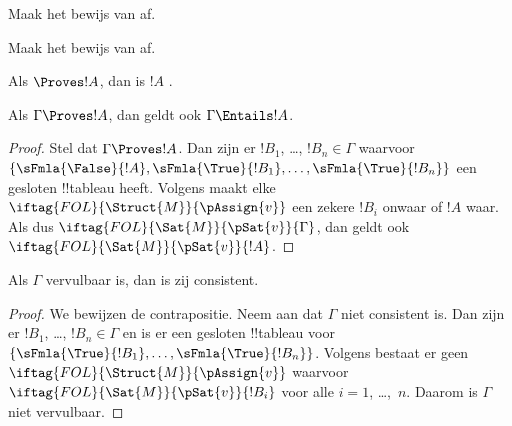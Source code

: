 \documentclass[../../../include/open-logic-section]{subfiles}
\begin{document}
\begin{prob}
Maak het bewijs van  af.
\end{prob}
\tagendprob

\begin{prob}
Maak het bewijs van  af.
\end{prob}
\tagendprob

\begin{cor}
Als $\Proves !A$, dan is $!A$ .
\end{cor}

\begin{cor}
Als $\Gamma \Proves !A$, dan geldt ook $\Gamma \Entails !A$.
\end{cor}

\begin{proof}
  Stel dat $\Gamma \Proves !A$. Dan zijn er $!B_1$, \dots,
  $!B_n \in \Gamma$ waarvoor
  $\{\sFmla{\False}{!A}, \sFmla{\True}{!B_1}, \dots,
  \sFmla{\True}{!B_n}\}$ een gesloten !!{tableau} heeft. Volgens
   maakt elke
  ~$\iftag{FOL}{\Struct{M}}{\pAssign{v}}$
  een zekere $!B_i$ onwaar of $!A$ waar. Als dus
  $\iftag{FOL}{\Sat{M}}{\pSat{v}}{\Gamma}$, dan geldt ook
  $\iftag{FOL}{\Sat{M}}{\pSat{v}}{!A}$.
\end{proof}

\begin{cor}
Als $\Gamma$ vervulbaar is, dan is zij consistent.
\end{cor}

\begin{proof}
We bewijzen de contrapositie. Neem aan dat $\Gamma$ niet consistent
is. Dan zijn er $!B_1$, \dots, $!B_n \in \Gamma$ en is er een gesloten
!!{tableau} voor
$\{\sFmla{\True}{!B_1}, \dots, \sFmla{\True}{!B_n}\}$. Volgens
 bestaat er geen
$\iftag{FOL}{\Struct{M}}{\pAssign{v}}$ waarvoor
$\iftag{FOL}{\Sat{M}}{\pSat{v}}{!B_i}$ voor alle $i=1$, \dots,~$n$.
Daarom is $\Gamma$ niet vervulbaar.
\end{proof}
\end{document}

